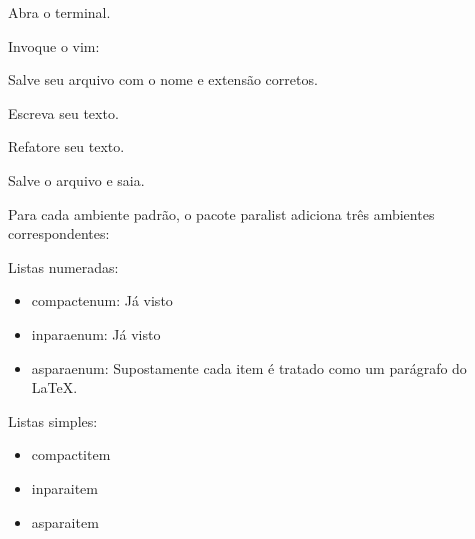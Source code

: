 \begin{compactenum}
\item Abra o terminal.
\item Invoque o vim:
\begin{asparaenum}
\item Salve seu arquivo com o nome e extensão corretos.
\item Escreva seu texto.
\item Refatore seu texto.
\end{asparaenum}
\item Salve o arquivo e saia.
\end{compactenum}

Para cada ambiente padrão, o pacote paralist adiciona três ambientes correspondentes:

Listas numeradas:
\begin{itemize}
	\item compactenum: Já visto
	\item inparaenum: Já visto
	\item asparaenum: Supostamente cada item é tratado como um parágrafo do LaTeX.
\end{itemize}

Listas simples:
\begin{itemize}
	\item compactitem
	\item inparaitem
	\item asparaitem
\end{itemize}


\newpage
